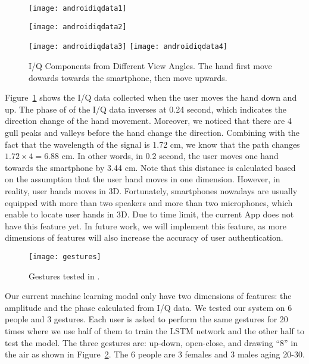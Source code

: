 \begin{figure}[!h]
	\centering
	\texttt{[image: androidiqdata1]}
	\begin{minipage}{.4\linewidth}
		\texttt{[image: androidiqdata2]}
	\end{minipage}
	\hfil
	\begin{minipage}{.5\linewidth}
		\texttt{[image: androidiqdata3]}
		\texttt{[image: androidiqdata4]}
	\end{minipage}
	\caption[I/Q Components Collected by UltraUnlockApp]{I/Q Components from Different View Angles. The hand first move dowards towards the smartphone, then move upwards.}
	\label{fig:androidiqdata}
\end{figure}

Figure~\ref{fig:androidiqdata} shows the I/Q data collected when the user moves the hand down and up. The phase of of the I/Q data inverses at 0.24 second, which indicates the direction change of the hand movement. Moreover, we noticed that there are 4 gull peaks and valleys before the hand change the direction. Combining with the fact that the wavelength of the signal is 1.72 cm, we know that the path changes $1.72 \times 4 = 6.88$ cm. In other words, in 0.2 second, the user moves one hand towards the smartphone by 3.44 cm. Note that this distance is calculated based on the assumption that the user hand moves in one dimension. However, in reality, user hands moves in 3D. Fortunately, smartphones nowadays are usually equipped with more than two speakers and more than two microphones, which enable {\uu} to locate user hands in 3D. Due to time limit, the current {\uu}App does not have this feature yet. In future work, we will implement this feature, as more dimensions of features will also increase the accuracy of user authentication.

\begin{figure}[h]
	\centering
	\begin{minipage}{.6\linewidth}
		\texttt{[image: gestures]}
	\end{minipage}
	\caption{Gestures tested in {\uu}.}	
	\label{fig:gestures}
\end{figure}


Our current machine learning modal only have two dimensions of features: the amplitude and the phase calculated from I/Q data. We tested our {\uu} system on 6 people and 3 gestures. Each user is asked to perform the same gestures for 20 times where we use half of them to train the LSTM network and the other half to test the model. The three gestures are: up-down, open-close, and drawing ``8'' in the air as shown in Figure~\ref{fig:gestures}. The 6 people are 3 females and 3 males aging 20-30. 


